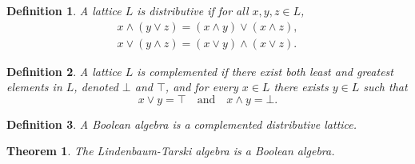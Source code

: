 \documentclass[titlepage]{article}
\newtheorem{theorem}{Theorem}[section]
\newtheorem{definition}{Definition}[section]
\begin{document}
\begin{definition}
    A lattice $L$ is distributive if for all $x,y,z \in L$,
    \begin{align*}
        x \wedge (y \vee z) = (x \wedge y) \vee (x \wedge z), \\
        x \vee (y \wedge z) = (x \vee y) \wedge (x \vee z).
    \end{align*}
\end{definition}

\begin{definition}
    A lattice $L$ is complemented if there exist both least and greatest elements in $L$, denoted $\bot$ and $\top$, and for every $x\in L$ there exists $y\in L$ such that
    $$x \vee y = \top \quad \text{and} \quad x\wedge y = \bot.$$
\end{definition}

\begin{definition}
    A Boolean algebra is a complemented distributive lattice.
\end{definition}

\begin{theorem}\label{LT-bool}
    The Lindenbaum-Tarski algebra is a Boolean algebra.
\end{theorem}
\end{document}
